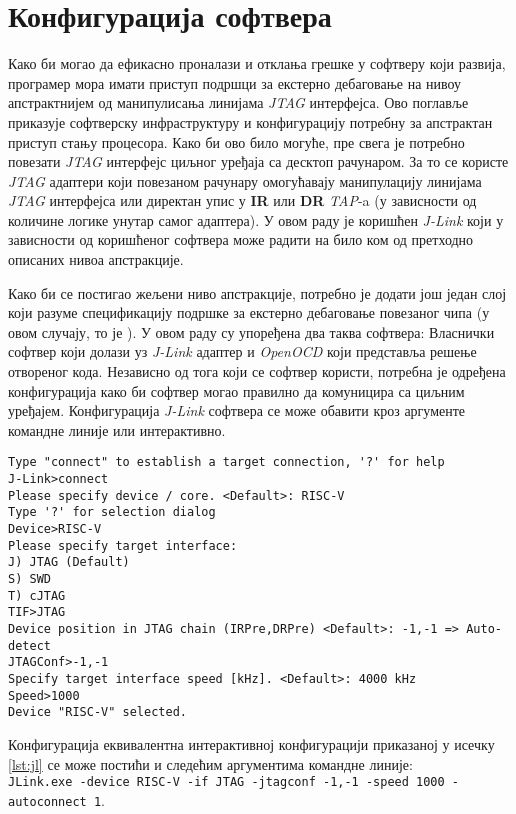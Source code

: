 \chapter{Конфигурација софтвера}

Како би могао да ефикасно проналази и отклања грешке у софтверу који развија, програмер мора имати приступ подршци за екстерно дебаговање на нивоу апстрактнијем од манипулисања линијама \textit{\acrshort{JTAG}} интерфејса. Ово поглавље приказује софтверску инфраструктуру и конфигурацију потребну за апстрактан приступ стању процесора. Како би ово било могуће, пре свега је потребно повезати  \textit{\acrshort{JTAG}} интерфејс циљног уређаја са десктоп рачунаром. За то се користе \textit{\acrshort{JTAG}} адаптери који повезаном рачунару омогућавају манипулацију линијама \textit{\acrshort{JTAG}} интерфејса или директан упис у \textbf{\acrshort{IR}} или \textbf{\acrshort{DR}} \textit{\acrshort{TAP}}-a (у зависности од количине логике унутар самог адаптера). У овом раду је коришћен \textit{J-Link} који у зависности од коришћеног софтвера може радити на било ком од претходно описаних нивоа апстракције.

Како би се постигао жељени ниво апстракције, потребно је додати још један слој који разуме спецификацију подршке за екстерно дебаговање повезаног чипа (у овом случају, то је \cite{debug_spec}). У овом раду су упоређена два таква софтвера: Власнички софтвер који долази уз \textit{J-Link} адаптер и \textit{Open\acrshort{OCD}} који представља решење отвореног кода. Независно од тога који се софтвер користи, потребна је одређена конфигурација како би софтвер могао правилно да комуницира са циљним уређајем. Конфигурација \textit{J-Link} софтвера се може обавити кроз аргументе командне линије или интерактивно. 

\begin{lstlisting}[language=none,caption=Интерактивна конфигурација \textit{J-Link} софтвера неопходна за повезивање на имплементирано језгро,label=lst:jl]
Type "connect" to establish a target connection, '?' for help
J-Link>connect
Please specify device / core. <Default>: RISC-V
Type '?' for selection dialog
Device>RISC-V
Please specify target interface:
J) JTAG (Default)
S) SWD
T) cJTAG
TIF>JTAG
Device position in JTAG chain (IRPre,DRPre) <Default>: -1,-1 => Auto-detect
JTAGConf>-1,-1
Specify target interface speed [kHz]. <Default>: 4000 kHz
Speed>1000
Device "RISC-V" selected.
\end{lstlisting}

Конфигурација еквивалентна интерактивној конфигурацији приказаној у исечку \ref{lst:jl} се може постићи и следећим аргументима командне линије:\\ \lstinline[language=none,columns=fixed]{JLink.exe -device RISC-V -if JTAG -jtagconf -1,-1 -speed 1000 -autoconnect 1}.

